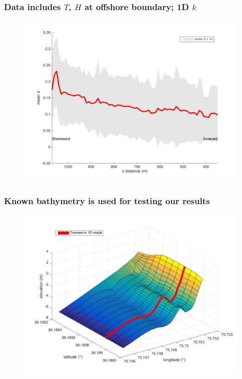 \documentclass[7pt]{beamer}
\begin{document}
\begin{frame}
	\frametitle{Data includes $T$, $H$ at offshore boundary; 1D $k$}
		\begin{figure}[H]
			\centering
			\includegraphics[width=1\linewidth]{img/k1Dmean_std.png}
		\end{figure}
\end{frame}

\begin{frame}
	\frametitle{Known bathymetry is used for testing our results}
			\begin{figure}[H]
	 			\includegraphics[width=1\linewidth]{img/trueBath2D.png}
	 		\end{figure}
\end{frame}
\end{document}
